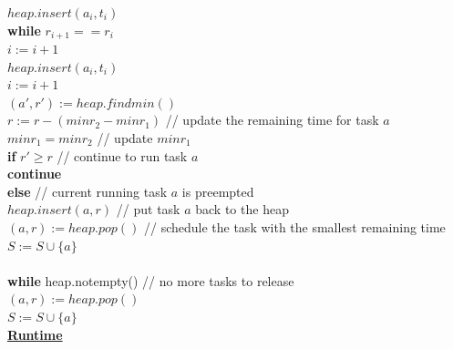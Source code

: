 \documentclass[11pt]{article}
\begin{document}
\begin{enumerate}
\begin{enumerate}
\-\hspace{6em} $heap.insert(a_i,t_i)$ \\
\-\hspace{6em} \textbf{while} $r_{i+1} == r_i$\\
\-\hspace{8em} $i := i + 1$ \\
\-\hspace{8em} $heap.insert(a_i,t_i)$ \\
\-\hspace{6em} $i := i + 1$ \\
\-\hspace{6em} $(a',r') := heap.findmin()$\\
\-\hspace{6em} $r := r - (minr_2 - minr_1)$ // update the remaining
time for task $a$\\
\-\hspace{6em} $minr_1 = minr_2$ // update $minr_1$\\
\-\hspace{6em} \textbf{if} $r' \geq r$ // continue to run task $a$\\
\-\hspace{8em} \textbf{continue}\\
\-\hspace{6em} \textbf{else} // current running task $a$ is preempted\\
\-\hspace{8em} $heap.insert(a,r)$ // put task $a$ back to the heap\\
\-\hspace{8em} $(a,r) := heap.pop()$ // schedule the task with the
smallest remaining time\\
\-\hspace{8em} $S := S \cup \{a\}$\\\\
\-\hspace{2em} \textbf{while} heap.notempty() // no more tasks to
release\\
\-\hspace{4em} $(a,r) := heap.pop()$\\
\-\hspace{4em} $S := S \cup \{a\}$\\

\underline{\textbf{Runtime}}


\end{enumerate}
\end{enumerate}
\end{document}
